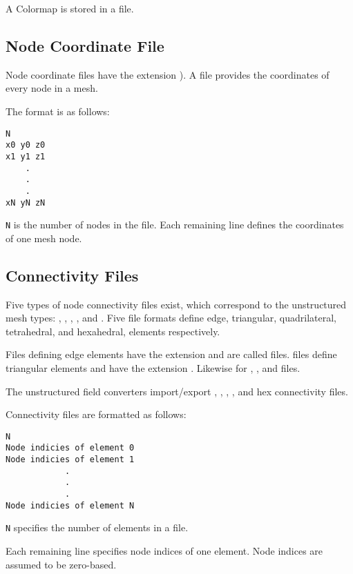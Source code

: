 A Colormap is stored in a  file.

\subsection{Node Coordinate File}
\label{sec:node_loc_fmt}

Node coordinate files have the extension ).  A
 file provides the coordinates of every node in a mesh.

The format is as follows:

\begin{verbatim}
N
x0 y0 z0
x1 y1 z1
    .
    .
    .
xN yN zN
\end{verbatim}

\verb|N| is the number of nodes in the file.  Each remaining line
defines the coordinates of one mesh node.

\subsection{Connectivity Files}
\label{sec:node_conn_fmt}

Five types of node connectivity files exist, which correspond to the
unstructured mesh types: , ,
, , and
.  Five file formats define
edge, triangular, quadrilateral, tetrahedral, and hexahedral,
elements respectively.

Files defining edge elements have the extension  and
are called  files.   files define triangular
elements and have the extension .  Likewise for
, , and  files.

The unstructured field converters import/export ,
, , , and hex connectivity
files.

Connectivity files are formatted as follows:

\begin{verbatim}
N
Node indicies of element 0
Node indicies of element 1
            .
            .
            .
Node indicies of element N
\end{verbatim}

\verb|N| specifies the number of elements in a file.

Each  remaining line specifies node indices of one element.
Node indices are assumed to be zero-based.

